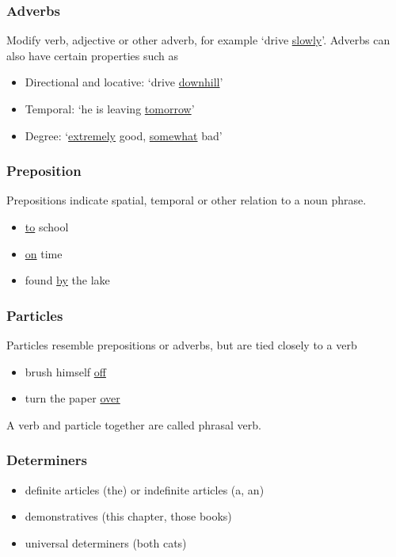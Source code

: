 \documentclass[Report.tex]{subfiles}
\begin{document}
\subsubsection{Adverbs}
Modify verb, adjective or other adverb, for example `drive \underline{slowly}'.
Adverbs can also have certain properties such as
\begin{itemize}
\item Directional and locative: `drive \underline{downhill}'
\item Temporal: `he is leaving \underline{tomorrow}'
\item Degree: `\underline{extremely} good, \underline{somewhat} bad'
\end{itemize}

\subsubsection{Preposition}
Prepositions indicate spatial, temporal or other relation to a noun phrase.
\begin{itemize}
\item \underline{to} school
\item \underline{on} time
\item found \underline{by} the lake
\end{itemize}

\subsubsection{Particles}
Particles resemble prepositions or adverbs, but are tied closely to a verb
\begin{itemize}
\item brush himself \underline{off}
\item turn the paper \underline{over}
\end{itemize}
A verb and particle together are called phrasal verb.

\subsubsection{Determiners}
\begin{itemize}
\item definite articles (the) or indefinite articles (a, an)
\item demonstratives (this chapter, those books)
\item universal determiners (both cats)
\end{itemize}
\end{document}
